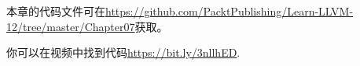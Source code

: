 本章的代码文件可在\url{https://github.com/PacktPublishing/Learn-LLVM-12/tree/master/Chapter07}获取。\par

你可以在视频中找到代码\url{https://bit.ly/3nllhED}.\par